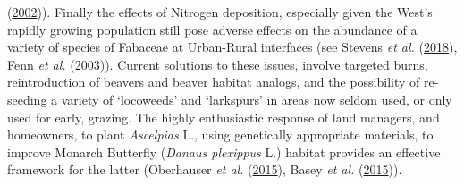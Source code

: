 \documentclass[
]{article}
\begin{document}
(\protect\hyperlink{ref-keane2002cascading}{2002})). Finally the effects
of Nitrogen deposition, especially given the West's rapidly growing
population still pose adverse effects on the abundance of a variety of
species of Fabaceae at Urban-Rural interfaces (see Stevens \emph{et al.}
(\protect\hyperlink{ref-stevens2018atmospheric}{2018}), Fenn \emph{et
al.} (\protect\hyperlink{ref-fenn2003ecological}{2003})). Current
solutions to these issues, involve targeted burns, reintroduction of
beavers and beaver habitat analogs, and the possibility of re-seeding a
variety of `locoweeds' and `larkspurs' in areas now seldom used, or only
used for early, grazing. The highly enthusiastic response of land
managers, and homeowners, to plant \emph{Ascelpias} L., using
genetically appropriate materials, to improve Monarch Butterfly
(\emph{Danaus plexippus} L.) habitat provides an effective framework for
the latter (Oberhauser \emph{et al.}
(\protect\hyperlink{ref-oberhauser2015monarchs}{2015}), Basey \emph{et
al.} (\protect\hyperlink{ref-basey2015producing}{2015})).
\end{document}
